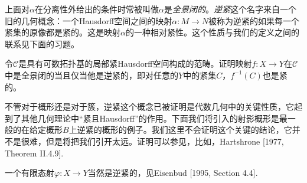 上面对$\alpha$在分离性外给出的条件时常被叫做$\alpha$是\textit{全景闭的}。\textit{逆紧}这个名字来自一个旧的几何概念：一个Hausdorff空间之间的映射$\alpha:M\to N$被称为逆紧的如果每一个紧集的原像都是紧的。这是映射$\alpha$的一种相对紧性。这个性质与我们的定义之间的联系见下面的习题。

\begin{exe}
令$\mathscr C$是具有可数拓扑基的局部紧Hausdorff空间构成的范畴。证明映射$f:X\to Y$在$\mathscr C$中是全景闭的当且仅当他是逆紧的，即对任意的$Y$中的紧集$C$，$f^{-1}(C)$也是紧的。
\end{exe}

不管对于概形还是对于簇，逆紧这个概念已被证明是代数几何中的关键性质，它起到了其他几何理论中“紧且Hausdorff”的作用。下面我们将引入的射影概形是最一般的在给定概形$B$上逆紧的概形的例子。我们这里不会证明这个关键的结论，它并不是很难，但是将把我们引开太远。证明可以参见，比如，Hartshrone [1977, Theorem II.4.9].

一个有限态射$\varphi:X\to Y$当然是逆紧的，见Eisenbud [1995, Section 4.4].
